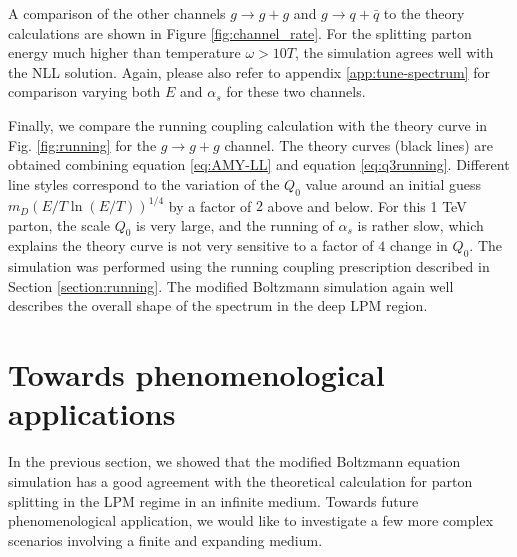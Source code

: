 \documentclass[aps, prc, reprint, amsmath, groupedaddress, nofootinbib]{revtex4-1}
\begin{document}
A comparison of the other channels $g\rightarrow g+g$ and $g\rightarrow q+\bar{q}$ to the theory calculations are shown in Figure \ref{fig:channel_rate}.
For the splitting parton energy much higher than temperature $\omega > 10 T$, the simulation agrees well with the NLL solution. 
Again, please also refer to appendix \ref{app:tune-spectrum} for comparison varying both $E$ and $\alpha_s$ for these two channels.


Finally, we compare the running coupling calculation with the theory curve in Fig. \ref{fig:running} for the $g\rightarrow g+g$ channel.
The theory curves (black lines) are obtained combining equation \ref{eq:AMY-LL} and equation \ref{eq:q3running}.
Different line styles correspond to the variation of the $Q_0$ value around an initial guess $m_D (E/T \ln(E/T) )^{1/4}$ by a factor of $2$ above and below.
For this 1 TeV parton, the scale $Q_0$ is very large, and the running of $\alpha_s$ is rather slow, which explains the theory curve is not very sensitive to a factor of $4$ change in $Q_0$.
The simulation was performed using the running coupling prescription described in Section \ref{section:running}.
The modified Boltzmann simulation again well describes the overall shape of the spectrum in the deep LPM region. 


\section{Towards phenomenological applications}\label{section:more}
In the previous section, we showed that the modified Boltzmann equation simulation has a good agreement with the theoretical calculation for parton splitting in the LPM regime in an infinite medium.
Towards future phenomenological application, we would like to investigate a few more complex scenarios involving a finite and expanding medium.
\end{document}
